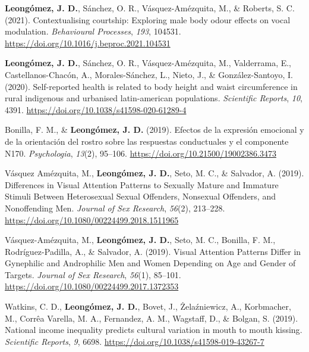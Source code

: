 \documentclass[11pt, a4paper]{awesome-cv}
\begin{document}
\leavevmode{}%
\textbf{Leongómez, J. D.}, Sánchez, O. R., Vásquez-Amézquita, M., \&
Roberts, S. C. (2021). Contextualising courtship: Exploring male body
odour effects on vocal modulation. \emph{Behavioural Processes},
\emph{193}, 104531. \url{https://doi.org/10.1016/j.beproc.2021.104531}

\leavevmode{}%
\textbf{Leongómez, J. D.}, Sánchez, O. R., Vásquez-Amézquita, M.,
Valderrama, E., Castellanos-Chacón, A., Morales-Sánchez, L., Nieto, J.,
\& González-Santoyo, I. (2020). Self-reported health is related to body
height and waist circumference in rural indigenous and urbanised
latin-american populations. \emph{Scientific Reports}, \emph{10}, 4391.
\url{https://doi.org/10.1038/s41598-020-61289-4}

\leavevmode{}%
Bonilla, F. M., \& \textbf{Leongómez, J. D.} (2019). {Efectos de la
expresi{ó}n emocional y de la orientaci{ó}n del rostro sobre las
respuestas conductuales y el componente N170}. \emph{Psychologia},
\emph{13}(2), 95--106. \url{https://doi.org/10.21500/19002386.3473}

\leavevmode{}%
Vásquez Amézquita, M., \textbf{Leongómez, J. D.}, Seto, M. C., \&
Salvador, A. (2019). {Differences in Visual Attention Patterns to
Sexually Mature and Immature Stimuli Between Heterosexual Sexual
Offenders, Nonsexual Offenders, and Nonoffending Men}. \emph{Journal of
Sex Research}, \emph{56}(2), 213--228.
\url{https://doi.org/10.1080/00224499.2018.1511965}

\leavevmode{}%
Vásquez-Amézquita, M., \textbf{Leongómez, J. D.}, Seto, M. C., Bonilla,
F. M., Rodríguez-Padilla, A., \& Salvador, A. (2019). {Visual Attention
Patterns Differ in Gynephilic and Androphilic Men and Women Depending on
Age and Gender of Targets}. \emph{Journal of Sex Research},
\emph{56}(1), 85--101.
\url{https://doi.org/10.1080/00224499.2017.1372353}

\leavevmode{}%
Watkins, C. D., \textbf{Leongómez, J. D.}, Bovet, J., Żelaźniewicz, A.,
Korbmacher, M., Corrêa Varella, M. A., Fernandez, A. M., Wagstaff, D.,
\& Bolgan, S. (2019). {National income inequality predicts cultural
variation in mouth to mouth kissing}. \emph{Scientific Reports},
\emph{9}, 6698. \url{https://doi.org/10.1038/s41598-019-43267-7}
\end{document}
